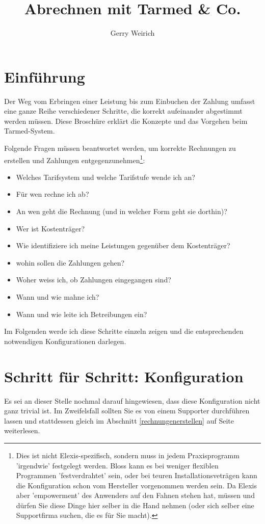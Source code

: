 \documentclass[a4paper]{scrartcl}
\title{Abrechnen mit Tarmed \& Co.}
\author{Gerry Weirich}
\begin{document}
\maketitle
\tableofcontents
\section{Einführung}
Der Weg vom Erbringen einer Leistung bis zum Einbuchen der Zahlung umfasst eine ganze Reihe verschiedener Schritte, die korrekt aufeinander abgestimmt werden müssen. Diese Broschüre erklärt die Konzepte und das Vorgehen beim Tarmed-System.

\medskip

Folgende Fragen müssen beantwortet werden, um korrekte Rechnungen zu erstellen und Zahlungen entgegenzunehmen\footnote{Dies ist nicht Elexis-spezifisch, sondern muss in jedem Praxisprogramm 'irgendwie' festgelegt werden. Bloss kann es bei weniger flexiblen Programmen 'festverdrahtet' sein, oder bei teuren Installationsveträgen kann die Konfiguration schon vom Hersteller vorgenommen werden sein. Da Elexis aber 'empowerment' des Anwenders auf den Fahnen stehen hat, müssen und dürfen Sie diese Dinge hier selber in die Hand nehmen (oder sich selber eine Supportfirma suchen, die es für Sie macht).}:

\begin{itemize}
\item Welches Tarifsystem und welche Tarifstufe wende ich an?
\item Für wen rechne ich ab?
\item An wen geht die Rechnung (und in welcher Form geht sie dorthin)?
\item Wer ist Kostenträger?
\item Wie identifiziere ich meine Leistungen gegenüber dem Kostenträger?
\item wohin sollen die Zahlungen gehen?
\item Woher weiss ich, ob Zahlungen eingegangen sind?
\item Wann und wie mahne ich?
\item Wann und wie leite ich Betreibungen ein?
\end{itemize}

Im Folgenden werde ich diese Schritte einzeln zeigen und die entsprechenden notwendigen Konfigurationen darlegen.

\section{Schritt für Schritt: Konfiguration}
Es sei an dieser Stelle nochmal darauf hingewiesen, dass diese Konfiguration nicht ganz trivial ist. Im Zweifelsfall sollten Sie es von einem Supporter durchführen lassen und stattdessen gleich im Abschnitt \ref{rechnungenerstellen} auf Seite \pageref{rechnungenerstellen} weiterlesen.
\end{document}
